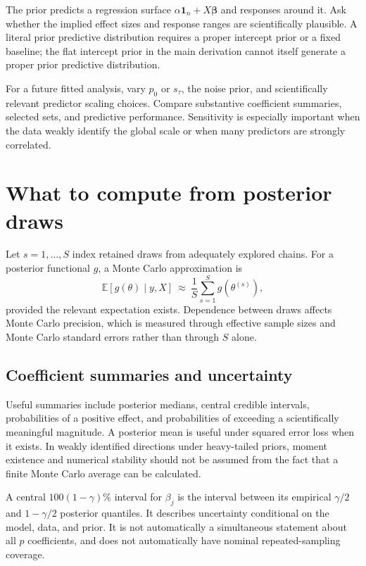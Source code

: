 \documentclass[11pt,letterpaper]{article}
\numberwithin{equation}{section}
\newcommand{\E}{\mathbb{E}}
\newcommand{\given}{\mid}
\newcommand{\bbeta}{\bm{\beta}}
\newcommand{\ones}{\mathbf{1}}
\begin{document}
The prior predicts a regression surface \(\alpha\ones_n+X\bbeta\) and
responses around it. Ask whether the implied effect sizes and response ranges
are scientifically plausible. A literal prior predictive distribution
requires a proper intercept prior or a fixed baseline; the flat intercept
prior in the main derivation cannot itself generate a proper prior predictive
distribution.

For a future fitted analysis, vary \(p_0\) or \(s_\tau\), the noise prior,
and scientifically relevant predictor scaling choices. Compare substantive
coefficient summaries, selected sets, and predictive performance. Sensitivity
is especially important when the data weakly identify the global scale or
when many predictors are strongly correlated.

\section{What to compute from posterior draws}\label{sec:inference}

Let \(s=1,\ldots,S\) index retained draws from adequately explored chains.
For a posterior functional \(g\), a Monte Carlo approximation is
\begin{equation}
 \E[g(\theta)\given y,X]\ \approx\ \frac1S\sum_{s=1}^Sg(\theta^{(s)}),
\end{equation}
provided the relevant expectation exists. Dependence between draws affects
Monte Carlo precision, which is measured through effective sample sizes and
Monte Carlo standard errors rather than through \(S\) alone.

\subsection{Coefficient summaries and uncertainty}

Useful summaries include posterior medians, central credible intervals,
probabilities of a positive effect, and probabilities of exceeding a
scientifically meaningful magnitude. A posterior mean is useful under squared
error loss when it exists. In weakly identified directions under heavy-tailed
priors, moment existence and numerical stability should not be assumed from
the fact that a finite Monte Carlo average can be calculated.

A central \(100(1-\gamma)\%\) interval for \(\beta_j\) is the interval
between its empirical \(\gamma/2\) and \(1-\gamma/2\) posterior quantiles.
It describes uncertainty conditional on the model, data, and prior. It is not
automatically a simultaneous statement about all \(p\) coefficients, and
does not automatically have nominal repeated-sampling coverage.
\end{document}
